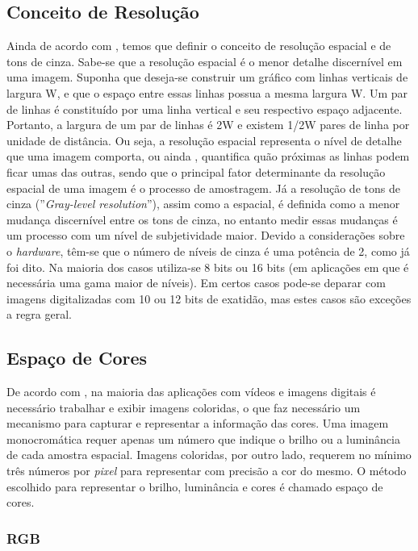 \subsection{Conceito de Resolução} \label{resolucao}

Ainda de acordo com , temos que definir o conceito de resolução espacial e de tons de cinza. Sabe-se que a resolução espacial é o menor detalhe discernível em uma imagem. Suponha que deseja-se construir um gráfico com linhas verticais de largura W, e que o espaço entre essas linhas possua a mesma largura W. Um par de linhas é constituído por uma linha vertical e seu respectivo espaço adjacente. Portanto, a largura de um par de linhas é 2W e existem 1/2W pares de linha por unidade de distância. Ou seja, a resolução espacial representa o nível de detalhe que uma imagem comporta, ou ainda , quantifica quão próximas as linhas podem ficar umas das outras, sendo que o principal fator determinante da resolução espacial de uma imagem é o processo de amostragem. Já a resolução de tons de cinza (''\textit{Gray-level resolution}''), assim como a espacial, é definida como a menor mudança discernível entre os tons de cinza, no entanto medir essas mudanças é um processo com um nível de subjetividade maior. Devido a considerações sobre o \textit{hardware}, têm-se que o número de níveis de cinza é uma potência de 2, como já foi dito. Na maioria dos casos utiliza-se 8 bits ou 16 bits (em aplicações em que é necessária uma gama maior de níveis). Em certos casos pode-se deparar com imagens digitalizadas com 10 ou 12 bits de exatidão, mas estes casos são exceções a regra geral.    

\subsection{Espaço de Cores}

De acordo com , na maioria das aplicações com vídeos e imagens digitais é necessário trabalhar e exibir imagens coloridas, o que faz necessário um mecanismo para capturar e representar a informação das cores. Uma imagem monocromática requer apenas um número que indique o brilho ou a luminância de cada amostra espacial. Imagens coloridas, por outro lado, requerem no mínimo três números por \textit{pixel} para representar com precisão a cor do mesmo. O método escolhido para representar o brilho, luminância e cores é chamado espaço de cores.

\subsubsection{RGB}

